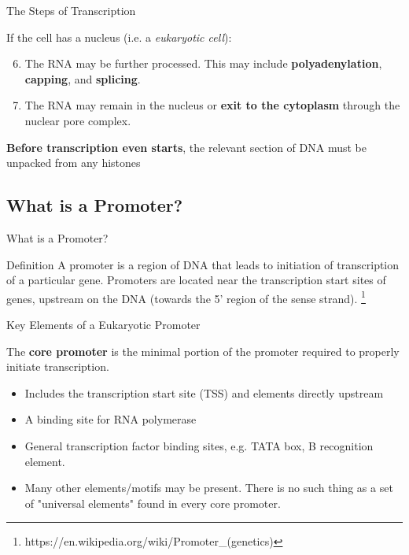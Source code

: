 \documentclass[11pt]{beamer}
\begin{document}
\begin{frame}{The Steps of Transcription}

If the cell has a nucleus (i.e. a \textit{eukaryotic cell}): \\

	\begin{enumerate}
	\setcounter{enumi}{5}

		\item The RNA may be further processed. This may include \textbf{polyadenylation}, \textbf{capping}, and \textbf{splicing}.
		\item The RNA may remain in the nucleus or \textbf{exit to the cytoplasm} through the nuclear pore complex.
	\end{enumerate}
	
\textbf{Before transcription even starts}, the relevant section of DNA must be unpacked from any histones

\end{frame}

\subsection{What is a Promoter?}

\begin{frame}{What is a Promoter?}

	\begin{block}{Definition}
	A promoter is a region of DNA that leads to initiation of transcription of a particular gene. 
	Promoters are located near the transcription start sites of genes, upstream on the DNA (towards the 5' region of the sense strand). \footnote{https://en.wikipedia.org/wiki/Promoter\_(genetics)}
	\end{block}

\end{frame}

\begin{frame}{Key Elements of a Eukaryotic Promoter}

The \textbf{core promoter} is the minimal portion of the promoter required to properly initiate transcription.

	\begin{itemize}
		\item Includes the transcription start site (TSS) and elements directly upstream
		\item A binding site for RNA polymerase
		\item General transcription factor binding sites, e.g. TATA box, B recognition element.
		\item Many other elements/motifs may be present. 
			There is no such thing as a set of "universal elements" found in every core promoter.
	\end{itemize}

\end{frame}
\end{document}
